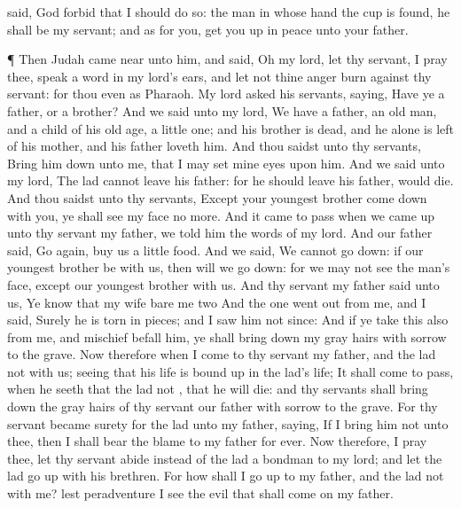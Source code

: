 {said, God
forbid that I should
do
so:
{} the
man in whose
hand the
cup is
found, he shall be my
servant; and as for you, get you
up in
peace unto your
father.
\par }{\PP {}¶ Then
Judah came
near unto him, and
said,
Oh my
lord, let thy
servant, I pray thee,
speak a
word in my
lord’s
ears, and let not thine
anger
burn against thy
servant: for thou
{} even as
Pharaoh.
My
lord
asked his
servants,
saying,
Have ye a
father, or a
brother?
And we
said unto my
lord, We
have a
father, an old
man, and a
child of his old
age, a little
one; and his
brother is
dead, and he alone is
left of his
mother, and his
father
loveth him.
And thou
saidst unto thy
servants, Bring him
down unto me, that I may
set mine
eyes upon him.
And we
said unto my
lord, The
lad
cannot
leave his
father: for
{} he should
leave his
father,
{} would
die.
And thou
saidst unto thy
servants,
Except your
youngest
brother come
down with you, ye shall
see my
face no
more.
And it came to pass when we came
up unto thy
servant my
father, we
told him the
words of my
lord.
And our
father
said, Go
again,
{}
buy us a
little
food.
And we
said, We
cannot go
down: if our
youngest
brother
be with us, then will we go
down: for we
may not
see the
man’s
face,
except our
youngest
brother
{} with us.
And thy
servant my
father
said unto us, Ye
know that my
wife
bare me
two
{}
And the
one went
out from me, and I
said,
Surely he is torn in
pieces; and I saw
him not
since:
And if ye
take this also
from
me, and
mischief befall
him, ye shall bring
down my gray
hairs with
sorrow to the
grave.
Now therefore when I
come to thy
servant my
father, and the
lad
{} not with us; seeing that his
life is bound
up in the
lad’s life;
It shall come to pass, when he
seeth that the
lad
{} not
{}, that he will
die: and thy
servants shall bring
down the gray
hairs of thy
servant our
father with
sorrow to the
grave.
For thy
servant became
surety for the
lad
unto my
father,
saying, If I
bring him not unto thee, then I shall bear the
blame to my
father for
ever.
Now therefore, I pray thee, let thy
servant
abide instead of the
lad a
bondman to my
lord; and let the
lad go
up with his
brethren.
For
how shall I go
up to my
father, and the
lad
{} not with me? lest peradventure I
see the
evil that shall come
on my
father.

}
